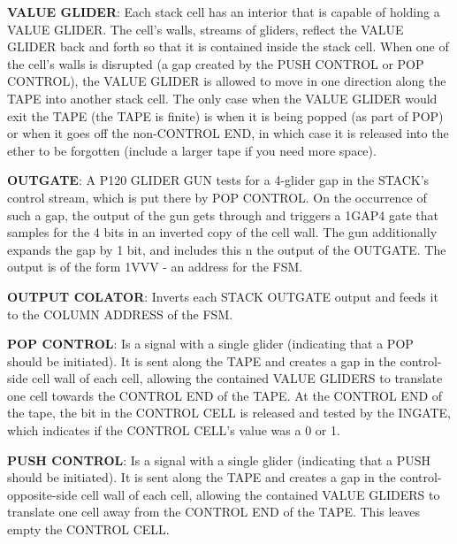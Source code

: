 \documentclass{article}
\begin{document}
\noindent\textbf{VALUE GLIDER}: Each stack cell has an interior that is capable of holding a VALUE GLIDER. The cell's walls, streams of gliders, reflect the VALUE GLIDER back and forth so that it is contained inside the stack cell. When one of the cell's walls is disrupted (a gap created by the PUSH CONTROL or POP CONTROL), the VALUE GLIDER is allowed to move in one direction along the TAPE into another stack cell. The only case when the VALUE GLIDER would exit the TAPE (the TAPE is finite) is when it is being popped (as part of POP) or when it goes off the non-CONTROL END, in which case it is released into the ether to be forgotten (include a larger tape if you need more space).

\vspace{1em}

\noindent\textbf{OUTGATE}: A P120 GLIDER GUN tests for a 4-glider gap in the STACK's control stream, which is put there by POP CONTROL. On the occurrence of such a gap, the output of the gun gets through and triggers a 1GAP4 gate that samples for the 4 bits in an inverted copy of the cell wall. The gun additionally expands the gap by 1 bit, and includes this n the output of the OUTGATE. The output is of the form 1VVV - an address for the FSM.

\vspace{1em}

\noindent\textbf{OUTPUT COLATOR}: Inverts each STACK OUTGATE output and feeds it to the COLUMN ADDRESS of the FSM.

\vspace{1em}

\noindent\textbf{POP CONTROL}: Is a signal with a single glider (indicating that a POP should be initiated). It is sent along the TAPE and creates a gap in the control-side cell wall of each cell, allowing the contained VALUE GLIDERS to translate one cell towards the CONTROL END of the TAPE. At the CONTROL END of the tape, the bit in the CONTROL CELL is released and tested by the INGATE, which indicates if the CONTROL CELL's value was a 0 or 1.

\vspace{1em}

\noindent\textbf{PUSH CONTROL}: Is a signal with a single glider (indicating that a PUSH should be initiated). It is sent along the TAPE and creates a gap in the control-opposite-side cell wall of each cell, allowing the contained VALUE GLIDERS to translate one cell away from the CONTROL END of the TAPE. This leaves empty the CONTROL CELL.
\end{document}
